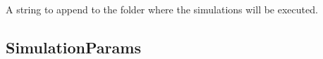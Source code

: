 \documentclass[letterpaper,10pt,english]{sphinxmanual}
\begin{document}
\begin{fulllineitems}
\begin{fulllineitems}
\label{\detokenize{code_documentation:raypyng.simulate.Simulate.simulation_name}}
\pysigstartsignatures
{}
\pysigstopsignatures
\sphinxAtStartPar
A string to append to the folder where the simulations will be executed.

\end{fulllineitems}


\end{fulllineitems}



\subsection{SimulationParams}
\label{\detokenize{code_documentation:simulationparams}}
\end{document}
